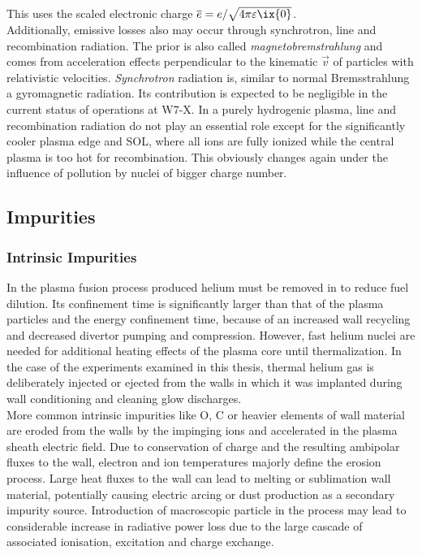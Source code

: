 %
            This uses the scaled electronic charge $\overline{e}=e/\sqrt{4\pi\varepsilon\ix{0}}$.\cite{WikiBremsstrahl}\\%
            Additionally, emissive losses also may occur through synchrotron, line and recombination radiation. The prior is also called \textit{magnetobremstrahlung} and comes from acceleration effects perpendicular to the kinematic $\vec{v}$ of particles with relativistic velocities. \textit{Synchrotron} radiation is, similar to normal Bremsstrahlung a gyromagnetic radiation. Its contribution is expected to be negligible in the current status of operations at W7-X. In a purely hydrogenic plasma, line and recombination radiation do not play an essential role except for the significantly cooler plasma edge and SOL, where all ions are fully ionized while the central plasma is too hot for recombination. This obviously changes again under the influence of pollution by nuclei of bigger charge number\cite{WikiSynchrotron}.%
%
        \subsection{Impurities}\label{subsec:impurities}%

            \subsubsection*{Intrinsic Impurities}%

                In the plasma fusion process produced helium must be removed in to reduce fuel dilution. Its confinement time is significantly larger than that of the plasma particles and the energy confinement time, because of an increased wall recycling and decreased divertor pumping and compression. However, fast helium nuclei are needed for additional heating effects of the plasma core until thermalization. In the case of the experiments examined in this thesis, thermal helium gas is deliberately injected or ejected from the walls in which it was implanted during wall conditioning and cleaning glow discharges\cite{Hogan2000,Mavrin2020,Bosch2000}.\\%
                More common intrinsic impurities like O, C or heavier elements of wall material are eroded from the walls by the impinging ions and accelerated in the plasma sheath electric field. Due to conservation of charge and the resulting ambipolar fluxes to the wall, electron and ion temperatures majorly define the erosion process. Large heat fluxes to the wall can lead to melting or sublimation wall material, potentially causing electric arcing or dust production as a secondary impurity source. Introduction of macroscopic particle in the process may lead to considerable increase in radiative power loss due to the large cascade of associated ionisation, excitation and charge exchange\cite{Balden2014,Rohde2009,Sereda2020}.%
%
